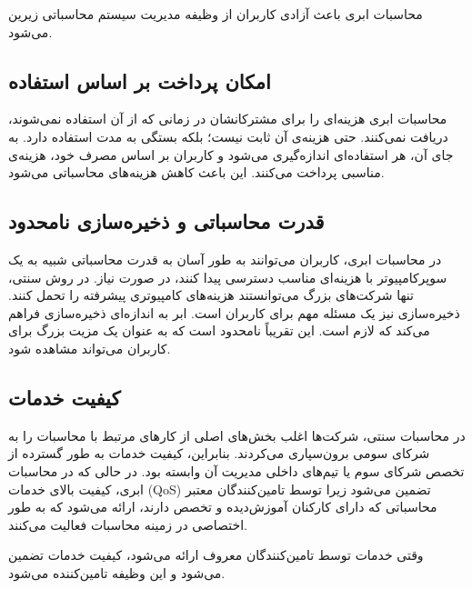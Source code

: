 \documentclass{book}
\begin{document}
                \begin{addinfo}
                    
                    محاسبات ابری باعث آزادی کاربران از وظیفه مدیریت سیستم محاسباتی زیرین می‌شود.

                \end{addinfo}


    \subsection{امکان پرداخت بر اساس استفاده}
    محاسبات ابری هزینه‌ای را برای مشترکانشان در زمانی که از آن استفاده نمی‌شوند، دریافت نمی‌کنند. حتی هزینه‌ی آن ثابت نیست؛ بلکه بستگی به مدت استفاده دارد. به جای آن، هر استفاده‌ای اندازه‌گیری می‌شود و کاربران بر اساس مصرف خود، هزینه‌ی مناسبی پرداخت می‌کنند. این باعث کاهش هزینه‌های محاسباتی می‌شود.

    \subsection{قدرت محاسباتی و ذخیره‌سازی نامحدود}
    در محاسبات ابری، کاربران می‌توانند به طور آسان به قدرت محاسباتی شبیه به یک سوپرکامپیوتر با هزینه‌ای مناسب دسترسی پیدا کنند، در صورت نیاز. در روش سنتی، تنها شرکت‌های بزرگ می‌توانستند هزینه‌های کامپیوتری پیشرفته را تحمل کنند. ذخیره‌سازی نیز یک مسئله مهم برای کاربران است. ابر به اندازه‌ای ذخیره‌سازی فراهم می‌کند که لازم است. این تقریباً نامحدود است که به عنوان یک مزیت بزرگ برای کاربران می‌تواند مشاهده شود.

    \subsection{کیفیت خدمات}
    در محاسبات سنتی، شرکت‌ها اغلب بخش‌های اصلی از کارهای مرتبط با محاسبات را به شرکای سومی برون‌سپاری می‌کردند. بنابراین، کیفیت خدمات به طور گسترده از تخصص شرکای سوم یا تیم‌های داخلی مدیریت آن وابسته بود. در حالی که در محاسبات ابری، کیفیت بالای خدمات (QoS) تضمین می‌شود زیرا توسط تامین‌کنندگان معتبر محاسباتی که دارای کارکنان آموزش‌دیده و تخصص دارند، ارائه می‌شود که به طور اختصاصی در زمینه محاسبات فعالیت می‌کنند.
    
    وقتی خدمات توسط تامین‌کنندگان معروف ارائه می‌شود، کیفیت خدمات تضمین می‌شود و این وظیفه تامین‌کننده می‌شود.
\end{document}
